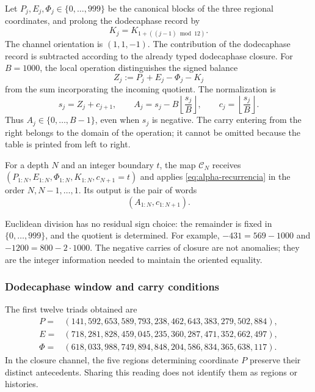 Let \(P_j,E_j,\Phi_j\in\{0,\ldots,999\}\) be the canonical blocks of
the three regional coordinates, and prolong the dodecaphase record by
\[
 K_j=K_{1+((j-1)\bmod12)}.
\]
The channel orientation is \((1,1,-1)\). The contribution of the dodecaphase record is
subtracted according to the already typed dodecaphase closure. For \(B=1000\), the
local operation distinguishes the signed balance
\[
 Z_j:=P_j+E_j-\Phi_j-K_j
\]
from the sum incorporating the incoming quotient. The normalization is
\begin{equation}
 s_j=Z_j+c_{j+1},\qquad
 A_j=s_j-B\left\lfloor\frac{s_j}{B}\right\rfloor,
 \qquad c_j=\left\lfloor\frac{s_j}{B}\right\rfloor.
 \label{eq:alpha-recurrencia}
\end{equation}
Thus \(A_j\in\{0,\ldots,B-1\}\), even when \(s_j\) is
negative. The carry entering from the right belongs to the domain of
the operation; it cannot be omitted because the table is printed from left
to right.

\begin{definition}
\label{def:alpha-finita}
For a depth \(N\) and an integer boundary \(t\), the map
\(\mathcal C_N\) receives
\((P_{1:N},E_{1:N},\Phi_{1:N},K_{1:N},c_{N+1}=t)\) and applies
\eqref{eq:alpha-recurrencia} in the order \(N,N-1,\ldots,1\). Its output
is the pair of words
\[
 (A_{1:N},c_{1:N+1}).
\]
\end{definition}

Euclidean division has no residual sign choice: the remainder is
fixed in \(\{0,\ldots,999\}\), and the quotient is determined. For
example, \(-431=569-1000\) and \(-1200=800-2\cdot1000\). The
negative carries of closure are not anomalies; they are the integer
information needed to maintain the oriented equality.

\subsubsection{Dodecaphase window and carry conditions}
\label{subsec:alpha-ventana}

The first twelve triads obtained are
\begin{align*}
 P={}&(141,592,653,589,793,238,462,643,383,279,502,884),\\
 E={}&(718,281,828,459,045,235,360,287,471,352,662,497),\\
 \Phi={}&(618,033,988,749,894,848,204,586,834,365,638,117).
\end{align*}
In the closure channel, the five regions determining coordinate
\(P\) preserve their distinct antecedents. Sharing this reading does not
identify them as regions or histories.

